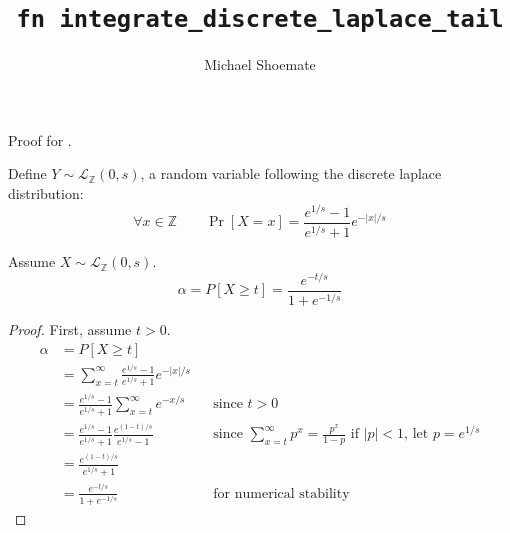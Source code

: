 \documentclass{article}
\title{\texttt{fn integrate\_discrete\_laplace\_tail}}
\author{Michael Shoemate}
\begin{document}
\maketitle

Proof for .

\begin{definition}
    Define $Y \sim \mathcal{L}_\mathbb{Z}(0, s)$, a random variable following the discrete laplace distribution:
    \begin{equation}
        \forall x \in \mathbb{Z} \qquad \Pr[X = x] = \frac{e^{1/s} - 1}{e^{1/s} + 1} e^{-|x|/s}
    \end{equation}
\end{definition}

\begin{theorem}
    Assume $X \sim \mathcal{L}_\mathbb{Z}(0, s)$.
    \begin{equation}
        \alpha = P[X \ge t] = \frac{e^{-t/s}}{1 + e^{-1/s}}
    \end{equation}
\end{theorem}

\begin{proof}
    First, assume $t > 0$.
    \begin{align*}
        \alpha &= P[X \ge t] \\
        &= \sum_{x=t}^{\infty} \frac{e^{1/s} - 1}{e^{1/s} + 1} e^{-|x|/s} \\
        &= \frac{e^{1/s} - 1}{e^{1/s} + 1} \sum_{x=t}^{\infty} e^{-x/s} 
            && \text{since } t > 0 \\
        &= \frac{e^{1/s} - 1}{e^{1/s} + 1} \frac{e^{(1-t)/s}}{e^{1/s} - 1} 
            && \text{since } \sum_{x=t}^\infty p^x = \frac{p^x}{1 - p} \text{ if } |p| < 1 \text{, let } p = e^{1/s}\\
        &= \frac{e^{(1 - t)/s}}{e^{1/s} + 1} \\
        &= \frac{e^{-t/s}}{1 + e^{-1/s}} && \text{for numerical stability}
    \end{align*}

\end{proof}
\end{document}
